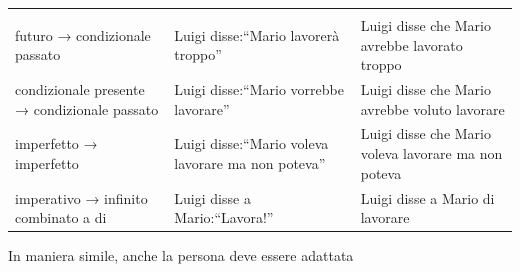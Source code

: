 \documentclass[
  a4paper,
  twoside,
  11pt,
  chapterprefix=false,
  bibliography=totocnumbered,
  listof=flat]{scrbook}
\begin{document}
\begin{longtable}[]{@{}lll@{}}
\begin{minipage}[t]{0.32\columnwidth}
\end{minipage}\tabularnewline
\begin{minipage}[t]{0.28\columnwidth}\raggedright
futuro → condizionale passato\strut
\end{minipage} & \begin{minipage}[t]{0.31\columnwidth}\raggedright
Luigi disse:\enquote{Mario lavorerà troppo}\strut
\end{minipage} & \begin{minipage}[t]{0.32\columnwidth}\raggedright
Luigi disse che Mario avrebbe lavorato troppo\strut
\end{minipage}\tabularnewline
\begin{minipage}[t]{0.28\columnwidth}\raggedright
condizionale presente → condizionale passato\strut
\end{minipage} & \begin{minipage}[t]{0.31\columnwidth}\raggedright
Luigi disse:\enquote{Mario vorrebbe lavorare}\strut
\end{minipage} & \begin{minipage}[t]{0.32\columnwidth}\raggedright
Luigi disse che Mario avrebbe voluto lavorare\strut
\end{minipage}\tabularnewline
\begin{minipage}[t]{0.28\columnwidth}\raggedright
imperfetto → imperfetto\strut
\end{minipage} & \begin{minipage}[t]{0.31\columnwidth}\raggedright
Luigi disse:\enquote{Mario voleva lavorare ma non poteva}\strut
\end{minipage} & \begin{minipage}[t]{0.32\columnwidth}\raggedright
Luigi disse che Mario voleva lavorare ma non poteva\strut
\end{minipage}\tabularnewline
\begin{minipage}[t]{0.28\columnwidth}\raggedright
imperativo → infinito combinato a di\strut
\end{minipage} & \begin{minipage}[t]{0.31\columnwidth}\raggedright
Luigi disse a Mario:\enquote{Lavora!}\strut
\end{minipage} & \begin{minipage}[t]{0.32\columnwidth}\raggedright
Luigi disse a Mario di lavorare\strut
\end{minipage}\tabularnewline
\bottomrule
\end{longtable}

In maniera simile, anche la persona deve essere adattata
\end{document}
